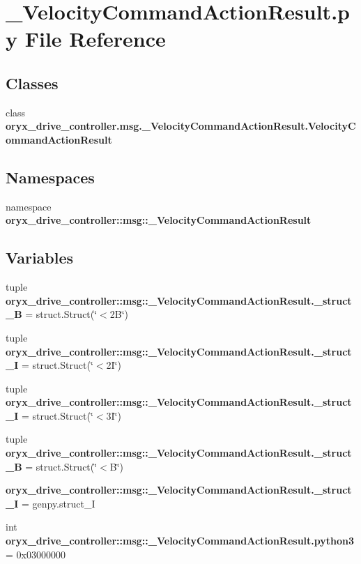 \section{\-\_\-\-Velocity\-Command\-Action\-Result.\-py \-File \-Reference}
\label{__VelocityCommandActionResult_8py}
\subsection*{\-Classes}
\begin{DoxyCompactItemize}
\item 
class {\bf oryx\-\_\-drive\-\_\-controller.\-msg.\-\_\-\-Velocity\-Command\-Action\-Result.\-Velocity\-Command\-Action\-Result}
\end{DoxyCompactItemize}
\subsection*{\-Namespaces}
\begin{DoxyCompactItemize}
\item 
namespace {\bf oryx\-\_\-drive\-\_\-controller\-::msg\-::\-\_\-\-Velocity\-Command\-Action\-Result}
\end{DoxyCompactItemize}
\subsection*{\-Variables}
\begin{DoxyCompactItemize}
\item 
tuple {\bf oryx\-\_\-drive\-\_\-controller\-::msg\-::\-\_\-\-Velocity\-Command\-Action\-Result.\-\_\-struct\-\_\-B} = struct.\-Struct(\char`\"{}$<$2\-B\char`\"{})
\item 
tuple {\bf oryx\-\_\-drive\-\_\-controller\-::msg\-::\-\_\-\-Velocity\-Command\-Action\-Result.\-\_\-struct\-\_\-I} = struct.\-Struct(\char`\"{}$<$2\-I\char`\"{})
\item 
tuple {\bf oryx\-\_\-drive\-\_\-controller\-::msg\-::\-\_\-\-Velocity\-Command\-Action\-Result.\-\_\-struct\-\_\-I} = struct.\-Struct(\char`\"{}$<$3\-I\char`\"{})
\item 
tuple {\bf oryx\-\_\-drive\-\_\-controller\-::msg\-::\-\_\-\-Velocity\-Command\-Action\-Result.\-\_\-struct\-\_\-\-B} = struct.\-Struct(\char`\"{}$<$\-B\char`\"{})
\item 
{\bf oryx\-\_\-drive\-\_\-controller\-::msg\-::\-\_\-\-Velocity\-Command\-Action\-Result.\-\_\-struct\-\_\-\-I} = genpy.\-struct\-\_\-\-I
\item 
int {\bf oryx\-\_\-drive\-\_\-controller\-::msg\-::\-\_\-\-Velocity\-Command\-Action\-Result.\-python3} = 0x03000000
\end{DoxyCompactItemize}
